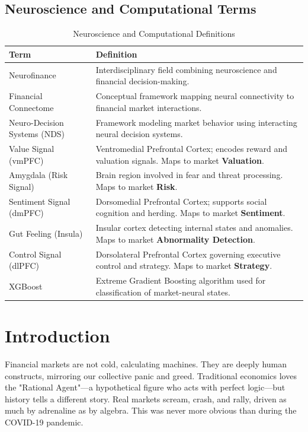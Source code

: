 \documentclass[conference]{IEEEtran}
\begin{document}
\subsection*{Neuroscience and Computational Terms}
\begin{table}[htbp]
\centering
\caption{Neuroscience and Computational Definitions}
\label{tab:neuro_definitions}
\renewcommand{\arraystretch}{1.3}
\begin{tabular}{@{}p{3cm}p{5.2cm}@{}}
\toprule
\textbf{Term} & \textbf{Definition} \\
\midrule
Neurofinance & Interdisciplinary field combining neuroscience and financial decision-making. \\
Financial Connectome & Conceptual framework mapping neural connectivity to financial market interactions. \\
Neuro-Decision Systems (NDS) & Framework modeling market behavior using interacting neural decision systems. \\
Value Signal (vmPFC) & Ventromedial Prefrontal Cortex; encodes reward and valuation signals. Maps to market \textbf{Valuation}. \\
Amygdala (Risk Signal) & Brain region involved in fear and threat processing. Maps to market \textbf{Risk}. \\
Sentiment Signal (dmPFC) & Dorsomedial Prefrontal Cortex; supports social cognition and herding. Maps to market \textbf{Sentiment}. \\
Gut Feeling (Insula) & Insular cortex detecting internal states and anomalies. Maps to market \textbf{Abnormality Detection}. \\
Control Signal (dlPFC) & Dorsolateral Prefrontal Cortex governing executive control and strategy. Maps to market \textbf{Strategy}. \\
XGBoost & Extreme Gradient Boosting algorithm used for classification of market-neural states. \\
\bottomrule
\end{tabular}
\end{table}

\section{Introduction}

Financial markets are not cold, calculating machines. They are deeply human constructs, mirroring our collective panic and greed. Traditional economics loves the "Rational Agent"---a hypothetical figure who acts with perfect logic---but history tells a different story. Real markets scream, crash, and rally, driven as much by adrenaline as by algebra. This was never more obvious than during the COVID-19 pandemic.
\end{document}
